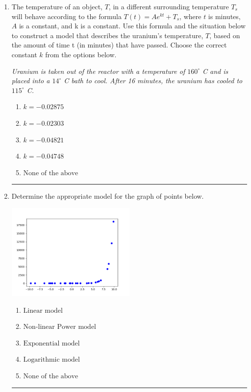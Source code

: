 \documentclass[14pt]{extbook}
\newcommand{\litem}[1]{\item#1\hspace*{-1cm}\rule{\textwidth}{0.4pt}}
\begin{document}
\begin{enumerate}
{\begin{enumerate}[label=\Alph*.]
\end{enumerate} }
\litem{
The temperature of an object, $T$, in a different surrounding temperature $T_s$ will behave according to the formula $T(t) = Ae^{kt} + T_s$, where $t$ is minutes, $A$ is a constant, and k is a constant. Use this formula and the situation below to construct a model that describes the uranium's temperature, $T$, based on the amount of time t (in minutes) that have passed. Choose the correct constant $k$ from the options below.
\begin{center}
    \textit{ Uranium is taken out of the reactor with a temperature of $160^{\circ}$ C and is placed into a $14^{\circ}$ C bath to cool. After 16 minutes, the uranium has cooled to $115^{\circ}$ C. }
\end{center}
\begin{enumerate}[label=\Alph*.]
\item \( k = -0.02875 \)
\item \( k = -0.02303 \)
\item \( k = -0.04821 \)
\item \( k = -0.04748 \)
\item \( \text{None of the above} \)

\end{enumerate} }
\litem{
Determine the appropriate model for the graph of points below.
\begin{center}
    \includegraphics[width=0.5\textwidth]{../Figures/identifyModelGraph11CopyB.png}
\end{center}
\begin{enumerate}[label=\Alph*.]
\item \( \text{Linear model} \)
\item \( \text{Non-linear Power model} \)
\item \( \text{Exponential model} \)
\item \( \text{Logarithmic model} \)
\item \( \text{None of the above} \)


\end{enumerate}}
\end{enumerate}
\end{document}

